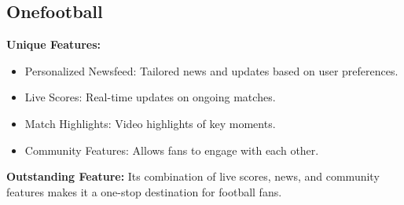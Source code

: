 \subsection{Onefootball}
\textbf{Unique Features:}
\begin{itemize}
    \item Personalized Newsfeed: Tailored news and updates based on user preferences.
    \item Live Scores: Real-time updates on ongoing matches.
    \item Match Highlights: Video highlights of key moments.
    \item Community Features: Allows fans to engage with each other.
\end{itemize}
\textbf{Outstanding Feature:} Its combination of live scores, news, and community features makes it a one-stop destination for football fans.